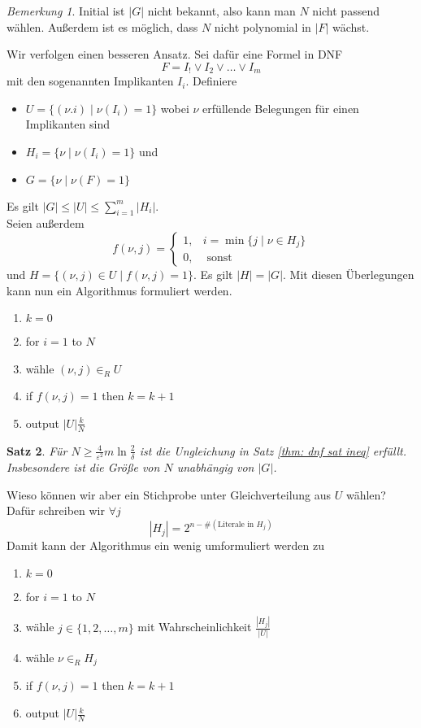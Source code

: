 \documentclass[a4paper, 12pt]{article}
\theoremstyle{plain}
\newtheorem{theorem}{Satz}[section] %
\theoremstyle{definition}
\theoremstyle{lemma}
\theoremstyle{remark}
\newtheorem{remark}[theorem]{Bemerkung}
\theoremstyle{corollary}
\theoremstyle{example}
\begin{document}
	\begin{remark}
		Initial ist $\left|G\right|$ nicht bekannt, also kann man $N$ nicht passend wählen. Außerdem ist es möglich, dass $N$ nicht polynomial in $\left|F\right|$ wächst.
	\end{remark}
	Wir verfolgen einen besseren Ansatz. Sei dafür eine Formel in DNF \[F = I_! \lor I_2 \lor \dots \lor I_m\] mit den sogenannten Implikanten $I_i$. Definiere \begin{itemize}
		\item $U = \{(\nu.i) \mid \nu(I_i) = 1\}$ wobei $\nu$ erfüllende Belegungen für einen Implikanten sind
		\item $H_i = \{\nu \mid \nu(I_i) = 1\}$ und 
		\item $G = \{\nu \mid \nu(F) = 1\}$
	\end{itemize}
	Es gilt $\left|G\right| \leq \left|U\right| \leq \sum_{i=1}^{m} \left|H_i\right|$.\\
	Seien außerdem \[f(\nu, j) = \begin{cases}
		1, & i = \min\{j \mid \nu \in H_j\}\\
		0, & \text{ sonst}
	\end{cases}\] und $H = \{(\nu, j) \in U \mid f(\nu, j)= 1\}$. Es gilt $\left|H\right| = \left|G\right|$. Mit diesen Überlegungen kann nun ein Algorithmus formuliert werden.
	\begin{enumerate}
		\item $k=0$
		\item for $i=1$ to $N$
		\item wähle $(\nu, j) \in_R U$
		\item if $f(\nu, j) = 1$ then $k=k+1$
		\item output $\left|U\right| \frac{k}{N}$
	\end{enumerate}
	\begin{theorem}
		Für $N \geq \frac{4}{\varepsilon^2}m\ln\frac{2}{\delta}$ ist die Ungleichung in Satz \ref{thm: dnf sat ineq} erfüllt. Insbesondere ist die Größe von $N$ unabhängig von $\left|G\right|$.
	\end{theorem}
	Wieso können wir aber ein Stichprobe unter Gleichverteilung aus $U$ wählen? Dafür schreiben wir $\forall j$\[\left|H_j\right| = 2^{n-\#(\text{Literale in } H_j)}\]
	Damit kann der Algorithmus ein wenig umformuliert werden zu
	\begin{enumerate}
		\item $k=0$
		\item for $i=1$ to $N$
		\item wähle $j \in \{1,2,\dots,m\}$ mit Wahrscheinlichkeit $\frac{\left|H_j\right|}{\left|U\right|}$
		\item wähle $\nu \in_R H_j$
		\item if $f(\nu, j) = 1$ then $k=k+1$
		\item output $\left|U\right| \frac{k}{N}$
	\end{enumerate}
\end{document}
